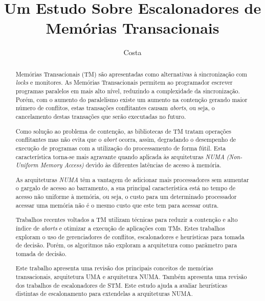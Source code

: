 \documentclass[ti]{texufpel}
\title{Um Estudo Sobre Escalonadores de Memórias Transacionais}
\author{Costa}{Michael Alexandre}
\begin{document}
\maketitle

\sloppy

\begin{abstract}

Memórias Transacionais (TM) são apresentadas como alternativas à sincronização com \emph{locks} e monitores. As Memórias Transacionais permitem ao programador escrever programas paralelos em mais alto nível, reduzindo a complexidade da sincronização. Porém, com o aumento do paralelismo existe um aumento na contenção gerando maior número de conflitos, estas transações conflitantes causam \emph{aborts}, ou seja, o cancelamento destas transações que serão executadas no futuro.

Como solução ao problema de contenção, as bibliotecas de TM tratam operações conflitantes mas não evita que o \emph{abort} ocorra, assim, degradando o desempenho de execução de programas com a utilização do processamento de forma fútil. Esta característica torna-se mais agravante quando aplicada às arquiteturas \emph{NUMA} \emph{(Non-Uniform Memory Access)} devido às diferentes latências de acesso à memória.

As arquiteturas \emph{NUMA} têm a vantagem de adicionar mais processadores sem aumentar o gargalo de acesso ao barramento, a sua principal característica está no tempo de acesso não uniforme à memória, ou seja, o custo para um determinado processador acessar uma memória não é o mesmo custo que este tem para acessar outra.

Trabalhos recentes voltados a TM utilizam técnicas para reduzir a contenção e alto índice de \emph{aborts} e otimizar a execução de aplicações com TMs. Estes trabalhos exploram o uso de gerenciadores de conflitos, escalonadores e heurísticas para tomada de decisão. Porém, os algoritmos não exploram a arquitetura como parâmetro para tomada de decisão.

Este trabalho apresenta uma revisão dos principais conceitos de memórias transacionais, arquitetura UMA e arquitetura NUMA. Também apresenta uma revisão dos trabalhos de escalonadores de STM. Este estudo ajuda a avaliar heurísticas distintas de escalonamento para extendelas a arquiteturas NUMA.

\end{abstract}
\end{document}
